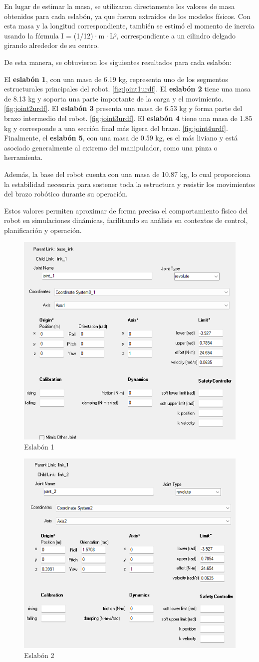 En lugar de estimar la masa, se utilizaron directamente los valores de masa obtenidos para cada eslabón, ya que fueron extraídos de los modelos físicos. Con esta masa y la longitud correspondiente, también se estimó el momento de inercia usando la fórmula I = (1/12)·m·L², correspondiente a un cilindro delgado girando alrededor de su centro.

De esta manera, se obtuvieron los siguientes resultados para cada eslabón:

El \textbf{eslabón 1}, con una masa de 6.19 kg, representa uno de los segmentos estructurales principales del robot. \autoref{fig:joint1urdf}.
El \textbf{eslabón 2} tiene una masa de 8.13 kg y soporta una parte importante de la carga y el movimiento.\autoref{fig:joint2urdf}.
El \textbf{eslabón 3} presenta una masa de 6.53 kg y forma parte del brazo intermedio del robot. \autoref{fig:joint3urdf}.
El \textbf{eslabón 4} tiene una masa de 1.85 kg y corresponde a una sección final más ligera del brazo. \autoref{fig:joint4urdf}.
Finalmente, el \textbf{eslabón 5}, con una masa de 0.59 kg, es el más liviano y está asociado generalmente al extremo del manipulador, como una pinza o herramienta.

Además, la base del robot cuenta con una masa de 10.87 kg, lo cual proporciona la estabilidad necesaria para sostener toda la estructura y resistir los movimientos del brazo robótico durante su operación.

Estos valores permiten aproximar de forma precisa el comportamiento físico del robot en simulaciones dinámicas, facilitando su análisis en contextos de control, planificación y operación.


\begin{figure}
	\centering
	\includegraphics[width=0.3\linewidth]{img/JOINT1URDF}
	\caption{Eslabón 1}
	\label{fig:joint1urdf}
\end{figure}

\begin{figure}
	\centering
	\includegraphics[width=0.3\linewidth]{img/JOINT2URDF}
	\caption{Eslabón 2}
	\label{fig:joint2urdf}
\end{figure}

